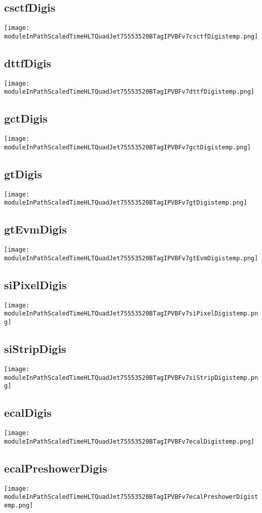 \documentclass[10pt,a5paper,landscape]{report}
\begin{document}
\subsection{csctfDigis} \centering \texttt{[image: moduleInPathScaledTimeHLTQuadJet75553520BTagIPVBFv7csctfDigistemp.png]}
\subsection{dttfDigis} \centering \texttt{[image: moduleInPathScaledTimeHLTQuadJet75553520BTagIPVBFv7dttfDigistemp.png]}
\subsection{gctDigis} \centering \texttt{[image: moduleInPathScaledTimeHLTQuadJet75553520BTagIPVBFv7gctDigistemp.png]}
\subsection{gtDigis} \centering \texttt{[image: moduleInPathScaledTimeHLTQuadJet75553520BTagIPVBFv7gtDigistemp.png]}
\subsection{gtEvmDigis} \centering \texttt{[image: moduleInPathScaledTimeHLTQuadJet75553520BTagIPVBFv7gtEvmDigistemp.png]}
\subsection{siPixelDigis} \centering \texttt{[image: moduleInPathScaledTimeHLTQuadJet75553520BTagIPVBFv7siPixelDigistemp.png]}
\subsection{siStripDigis} \centering \texttt{[image: moduleInPathScaledTimeHLTQuadJet75553520BTagIPVBFv7siStripDigistemp.png]}
\subsection{ecalDigis} \centering \texttt{[image: moduleInPathScaledTimeHLTQuadJet75553520BTagIPVBFv7ecalDigistemp.png]}
\subsection{ecalPreshowerDigis} \centering \texttt{[image: moduleInPathScaledTimeHLTQuadJet75553520BTagIPVBFv7ecalPreshowerDigistemp.png]}
\end{document}
